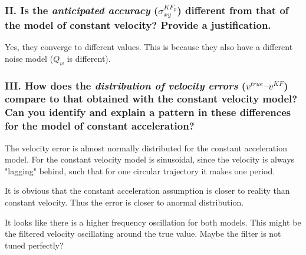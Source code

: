 \documentclass{article}
\begin{document}
\subsubsection*{II. Is the \textit{anticipated accuracy} ($\sigma_{xy}^{KF_{p}}$) different from that of the model of constant
velocity? Provide a justification.}

Yes, they converge to different values. This is because they also have a different noise model ($Q_w$ is different).

\subsubsection*{III. How does the \textit{distribution of velocity errors} ($v^{true} – v^{KF}$) compare to that obtained
with the constant velocity model? Can you identify and explain a pattern in these
differences for the model of constant acceleration?}

The velocity error is almost normally distributed for the constant acceleration model.
For the constant velocity model is sinusoidal, since the velocity is always "lagging" behind,
such that for one circular trajectory it makes one period.

It is obvious that the constant acceleration assumption is closer to reality than constant velocity.
Thus the error is closer to anormal distribution.

It looks like there is a higher frequency oscillation for both models.
This might be the filtered velocity oscillating around the true value.
Maybe the filter is not tuned perfectly?
\end{document}
